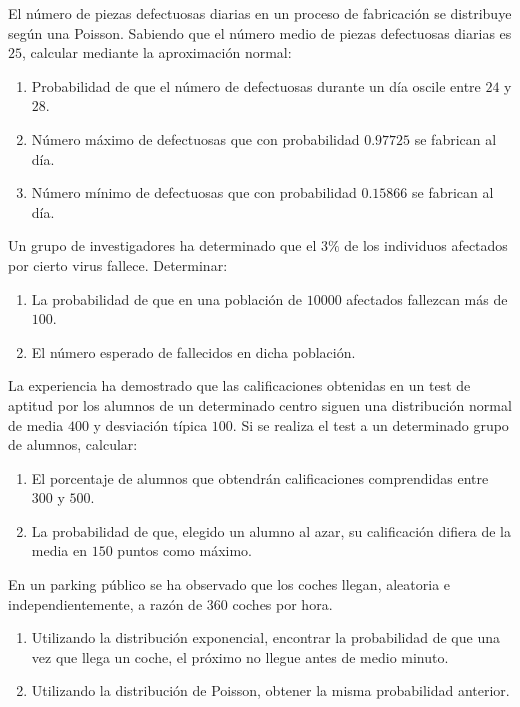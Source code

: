 \begin{ejercicio}
    El número de piezas defectuosas diarias en un proceso de fabricación se distribuye según una Poisson. Sabiendo que el número medio de piezas defectuosas diarias es $25$, calcular mediante la aproximación normal:
    \begin{enumerate}
        \item Probabilidad de que el número de defectuosas durante un día oscile entre $24$ y $28$.
        \item Número máximo de defectuosas que con probabilidad $0.97725$ se fabrican al día.
        \item Número mínimo de defectuosas que con probabilidad $0.15866$ se fabrican al día.
    \end{enumerate}
\end{ejercicio}

\begin{ejercicio}
    Un grupo de investigadores ha determinado que el $3\%$ de los individuos afectados por cierto virus fallece. Determinar:
    \begin{enumerate}
        \item La probabilidad de que en una población de $10000$ afectados fallezcan más de $100$.
        \item El número esperado de fallecidos en dicha población.
    \end{enumerate}
\end{ejercicio}

\begin{ejercicio}
    La experiencia ha demostrado que las calificaciones obtenidas en un test de aptitud por los alumnos de un determinado centro siguen una distribución normal de media $400$ y desviación típica $100$. Si se realiza el test a un determinado grupo de alumnos, calcular:
    \begin{enumerate}
        \item El porcentaje de alumnos que obtendrán calificaciones comprendidas entre $300$ y $500$.
        \item La probabilidad de que, elegido un alumno al azar, su calificación difiera de la media en $150$ puntos como máximo.
    \end{enumerate}
\end{ejercicio}

\begin{ejercicio}
    En un parking público se ha observado que los coches llegan, aleatoria e independientemente, a razón de $360$ coches por hora.
    \begin{enumerate}
        \item Utilizando la distribución exponencial, encontrar la probabilidad de que una vez que llega un coche, el próximo no llegue antes de medio minuto.
        \item Utilizando la distribución de Poisson, obtener la misma probabilidad anterior.
    \end{enumerate}
\end{ejercicio}

